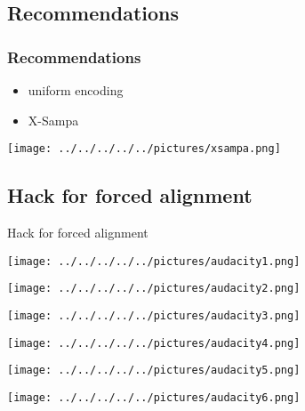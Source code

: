 \documentclass[12pt,a4paper]{beamer}
\begin{document}
\subsection{Recommendations}
\begin{frame}
    \frametitle{Recommendations}
    \begin{itemize}
        \item uniform encoding
        \item X-Sampa
    \end{itemize}
\end{frame}

\begin{frame}
    \centering
    \texttt{[image: ../../../../../pictures/xsampa.png]}
\end{frame}

\subsection{Hack for forced alignment}
\begin{frame}
    \centering
    {\LARGE Hack for forced alignment}
\end{frame}

\begin{frame}
    \centering
    \texttt{[image: ../../../../../pictures/audacity1.png]}
\end{frame}

\begin{frame}
    \centering
    \texttt{[image: ../../../../../pictures/audacity2.png]}
\end{frame}

\begin{frame}
    \centering
    \texttt{[image: ../../../../../pictures/audacity3.png]}
\end{frame}

\begin{frame}
    \centering
    \texttt{[image: ../../../../../pictures/audacity4.png]}
\end{frame}

\begin{frame}
    \centering
    \texttt{[image: ../../../../../pictures/audacity5.png]}
\end{frame}

\begin{frame}
    \centering
    \texttt{[image: ../../../../../pictures/audacity6.png]}
\end{frame}
\end{document}
